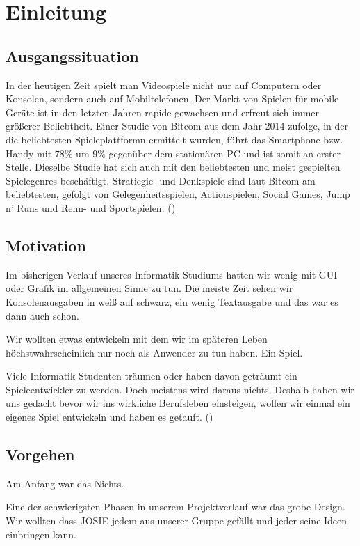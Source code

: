 \chapter{Einleitung}\label{ch:intro}

\section{Ausgangssituation}

In der heutigen Zeit spielt man Videospiele nicht nur auf Computern oder Konsolen, sondern auch auf Mobiltelefonen. Der Markt von Spielen für mobile Geräte ist in den letzten Jahren rapide gewachsen und erfreut sich immer größerer Beliebtheit. Einer Studie von Bitcom aus dem Jahr 2014 zufolge, in der die beliebtesten Spieleplattformn ermittelt wurden, führt das Smartphone bzw. Handy mit 78\% um 9\% gegenüber dem stationären PC und ist somit an erster Stelle. Dieselbe Studie hat sich auch mit den beliebtesten und meist gespielten Spielegenres beschäftigt. Stratiegie- und Denkspiele sind laut Bitcom am beliebtesten, gefolgt von Gelegenheitsspielen, Actionspielen, Social Games, Jump n' Runs und Renn- und Sportspielen.
()



\section{Motivation}

Im bisherigen Verlauf unseres Informatik-Studiums hatten wir wenig mit GUI oder Grafik im allgemeinen Sinne zu tun. Die meiste Zeit sehen wir Konsolenausgaben in weiß auf schwarz, ein wenig Textausgabe und das war es dann auch schon. 

Wir wollten etwas entwickeln mit dem wir im späteren Leben höchstwahrscheinlich nur noch als Anwender zu tun haben. Ein Spiel. 

Viele Informatik Studenten träumen oder haben davon geträumt ein Spieleentwickler zu werden. Doch meistens wird daraus nichts. Deshalb haben wir uns gedacht bevor wir ins wirkliche Berufsleben einsteigen, wollen wir einmal ein eigenes Spiel entwickeln und haben es \gamename getauft.
()

\section{Vorgehen}

Am Anfang war das Nichts.

Eine der schwierigsten Phasen in unserem Projektverlauf war das grobe Design. Wir wollten dass JOSIE jedem aus unserer Gruppe gefällt und jeder seine Ideen einbringen kann.


